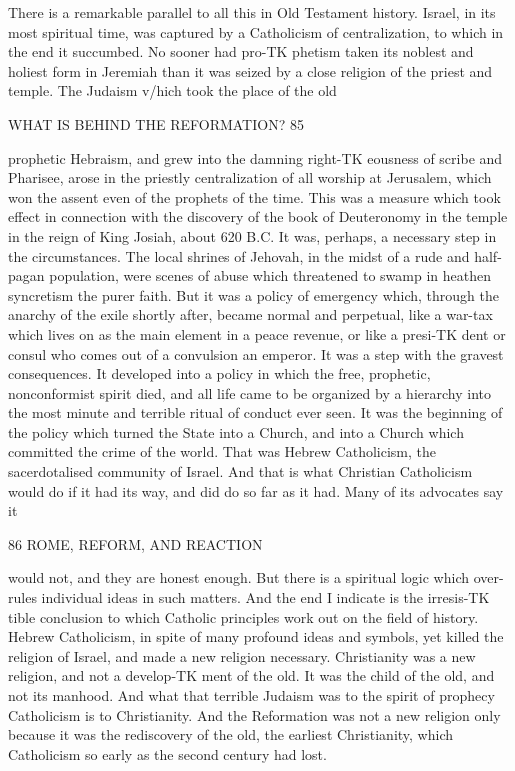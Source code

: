 \documentclass[12pt,a5paper,oneside]{book}
\begin{document}
There is a remarkable parallel to all this in Old 
Testament history. Israel, in its most spiritual time, 
was captured by a Catholicism of centralization, to 
which in the end it succumbed. No sooner had pro-TK
phetism taken its noblest and holiest form in Jeremiah 
than it was seized by a close religion of the priest and 
temple. The Judaism v/hich took the place of the old 



WHAT IS BEHIND THE REFORMATION? 85 

prophetic Hebraism, and grew into the damning right-TK
eousness of scribe and Pharisee, arose in the priestly 
centralization of all worship at Jerusalem, which won 
the assent even of the prophets of the time. This was 
a measure which took effect in connection with the 
discovery of the book of Deuteronomy in the temple 
in the reign of King Josiah, about 620 B.C. It was, 
perhaps, a necessary step in the circumstances. The 
local shrines of Jehovah, in the midst of a rude and 
half-pagan population, were scenes of abuse which 
threatened to swamp in heathen syncretism the purer 
faith. But it was a policy of emergency which, 
through the anarchy of the exile shortly after, became 
normal and perpetual, like a war-tax which lives on as 
the main element in a peace revenue, or like a presi-TK
dent or consul who comes out of a convulsion an 
emperor. It was a step with the gravest consequences. 
It developed into a policy in which the free, prophetic, 
nonconformist spirit died, and all life came to be 
organized by a hierarchy into the most minute and 
terrible ritual of conduct ever seen. It was the 
beginning of the policy which turned the State into a 
Church, and into a Church which committed the crime 
of the world. That was Hebrew Catholicism, the 
sacerdotalised community of Israel. And that is what 
Christian Catholicism would do if it had its way, and 
did do so far as it had. Many of its advocates say it 



86 ROME, REFORM, AND REACTION 

would not, and they are honest enough. But there is 
a spiritual logic which over-rules individual ideas in 
such matters. And the end I indicate is the irresis-TK
tible conclusion to which Catholic principles work out 
on the field of history. Hebrew Catholicism, in spite 
of many profound ideas and symbols, yet killed the 
religion of Israel, and made a new religion necessary. 
Christianity was a new religion, and not a develop-TK
ment of the old. It was the child of the old, and not 
its manhood. And what that terrible Judaism was to 
the spirit of prophecy Catholicism is to Christianity. 
And the Reformation was not a new religion only 
because it was the rediscovery of the old, the earliest 
Christianity, which Catholicism so early as the second 
century had lost. 
\end{document}
